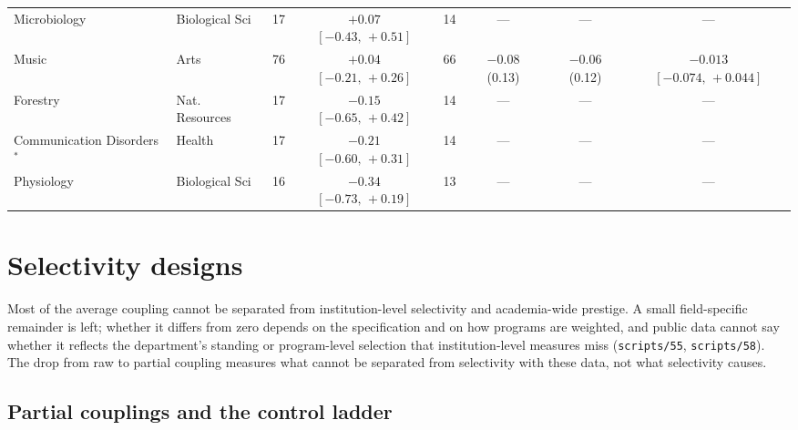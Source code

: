 \documentclass[11pt]{article}
\newcommand{\scr}[1]{\texttt{scripts/#1}}
\begin{document}
{\begin{longtable}{@{}>{\raggedright\arraybackslash}p{3.2cm}>{\raggedright\arraybackslash}p{1.9cm}rcrccc@{}}
Microbiology & Biological Sci & 17 & ${+}0.07$ $[{-}0.43,\,{+}0.51]$ & 14 & --- & --- & --- \\
Music & Arts & 76 & ${+}0.04$ $[{-}0.21,\,{+}0.26]$ & 66 & ${-}0.08$ (0.13) & ${-}0.06$ (0.12) & ${-}0.013$ $[{-}0.074,\,{+}0.044]$ \\
Forestry & Nat. Resources & 17 & ${-}0.15$ $[{-}0.65,\,{+}0.42]$ & 14 & --- & --- & --- \\
Communication Disorders$^{*}$ & Health & 17 & ${-}0.21$ $[{-}0.60,\,{+}0.31]$ & 14 & --- & --- & --- \\
Physiology & Biological Sci & 16 & ${-}0.34$ $[{-}0.73,\,{+}0.19]$ & 13 & --- & --- & --- \\
\end{longtable}
}

\clearpage
\section{Selectivity designs}\label{sec:selectivity}

Most of the average coupling cannot be separated from institution-level selectivity and academia-wide prestige.
A small field-specific remainder is left; whether it differs from zero depends on the specification and on how
programs are weighted, and public data cannot say whether it reflects the department's standing or program-level
selection that institution-level measures miss (\scr{55}, \scr{58}). The drop from raw to partial coupling
measures what cannot be separated from selectivity with these data, not what selectivity causes.

\subsection{Partial couplings and the control ladder}\label{sec:ladder}
\end{document}
